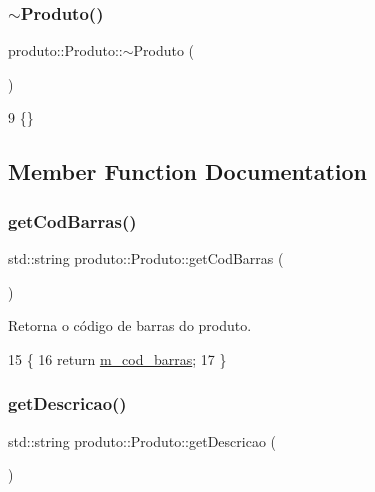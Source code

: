 \subsubsection{\texorpdfstring{$\sim$\+Produto()}{~Produto()}}
{\footnotesize\ttfamily produto\+::\+Produto\+::$\sim$\+Produto (\begin{DoxyParamCaption}{ }\end{DoxyParamCaption})\hspace{0.3cm}{\ttfamily [virtual]}}


\begin{DoxyCode}
9 \{\}
\end{DoxyCode}


\subsection{Member Function Documentation}
\mbox{\label{classproduto_1_1Produto_a6dbe3ecb8ff8b7b72a18ac70d52db292}} 
\subsubsection{\texorpdfstring{get\+Cod\+Barras()}{getCodBarras()}}
{\footnotesize\ttfamily std\+::string produto\+::\+Produto\+::get\+Cod\+Barras (\begin{DoxyParamCaption}{ }\end{DoxyParamCaption})}



Retorna o código de barras do produto. 


\begin{DoxyCode}
15                           \{
16         \textcolor{keywordflow}{return} \hyperlink{classproduto_1_1Produto_af441e885b23e4b6782be22c0be25ba72}{m\_cod\_barras};
17     \}
\end{DoxyCode}
\mbox{\label{classproduto_1_1Produto_a670047a018e413208f6a7ee37fef6ce0}} 
\subsubsection{\texorpdfstring{get\+Descricao()}{getDescricao()}}
{\footnotesize\ttfamily std\+::string produto\+::\+Produto\+::get\+Descricao (\begin{DoxyParamCaption}{ }\end{DoxyParamCaption})}




